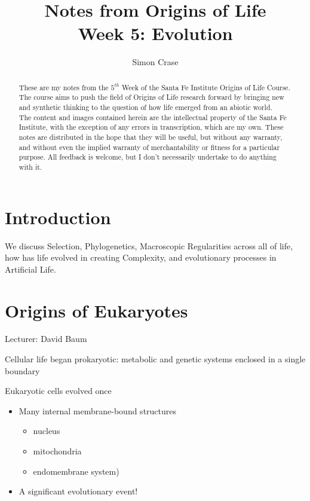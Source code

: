 \documentclass[]{article}
\title{
	Notes from Origins of Life\\
	Week 5: Evolution}
\author{Simon Crase}
\begin{document}
\maketitle

\begin{abstract}
   These are my notes from the $5^{th}$ Week of the Santa Fe Institute Origins of Life Course\cite{sfi2019}. The course aims to push the field of Origins of Life research forward by bringing new and synthetic thinking to the question of how life emerged from an abiotic world.\\
   The content and images contained herein are the intellectual property of the Santa Fe Institute, with the exception of any errors in transcription, which are my own.
   These notes are distributed in the hope that they will be useful,
   but without any warranty, and without even the implied warranty of
   merchantability or fitness for a particular purpose. All feedback is welcome,
   but I don't necessarily undertake to do anything with it.
\end{abstract}

\setcounter{tocdepth}{2}
\tableofcontents
\listoffigures

\section{Introduction}

We discuss Selection, Phylogenetics, Macroscopic Regularities across all of life, how has life evolved in creating Complexity, and evolutionary processes in Artificial Life. 

\section{Origins of Eukaryotes}

Lecturer: David Baum

Cellular life began prokaryotic: metabolic and genetic systems enclosed in a single
boundary

Eukaryotic cells evolved once

\begin{itemize}
	\item Many internal membrane-bound structures
	\begin{itemize}
		\item nucleus
		\item mitochondria
		\item endomembrane system)
	\end{itemize}
	\item A significant evolutionary event!
\end{itemize}
\end{document}
